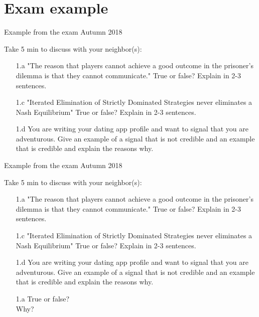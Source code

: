 \section{Exam example}

\begin{frame}{Example from the exam Autumn 2018}
\begin{multicols}{2}
  Take 5 min to discuss with your neighbor(s):
  \begin{itemize}
    \item[1.a] "The reason that players cannot achieve a good outcome in the prisoner’s dilemma is that they cannot communicate." True or false? Explain in 2-3 sentences.
    \item[1.c] "Iterated Elimination of Strictly Dominated Strategies never eliminates a Nash Equilibrium" True or false? Explain in 2-3 sentences.
    \item[1.d] You are writing your dating app profile and want to signal that you are adventurous. Give an example of a signal that is not credible and an example that is credible and explain the reasons why.
  \end{itemize}
\columnbreak
\vfill\null
\end{multicols}
\end{frame}

\begin{frame}{Example from the exam Autumn 2018}
\begin{multicols}{2}\color{lightgray}
  Take 5 min to discuss with your neighbor(s):
  \begin{itemize}
    \item[1.a] "The reason that players cannot achieve a good outcome in the prisoner’s dilemma is that they cannot communicate." True or false? Explain in 2-3 sentences.
    \color{lightgray}
    \item[\color{lightgray}1.c] "Iterated Elimination of Strictly Dominated Strategies never eliminates a Nash Equilibrium" True or false? Explain in 2-3 sentences.
    \item[\color{lightgray}1.d] You are writing your dating app profile and want to signal that you are adventurous. Give an example of a signal that is not credible and an example that is credible and explain the reasons why.
  \end{itemize}
\vfill\null
\columnbreak
\begin{itemize}
  \item[1.a] True or false? \\ Why?
\end{itemize}
\end{multicols}
\end{frame}

